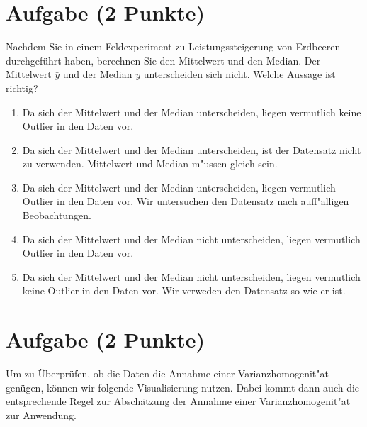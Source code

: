\documentclass[a4paper, 9pt]{scrartcl}\usepackage[]{graphicx}\usepackage[]{xcolor}
\begin{document}
\section{Aufgabe \hfill (2 Punkte)}



Nachdem Sie in einem Feldexperiment zu Leistungssteigerung von
Erdbeeren durchgef{\"u}hrt haben, berechnen Sie den Mittelwert und den
Median. Der Mittelwert $\bar{y}$ und der Median $\tilde{y}$
unterscheiden sich nicht. Welche Aussage ist richtig?




\begin{enumerate}
\item [\textbf{A} \msquare] Da sich der Mittelwert und der Median unterscheiden, liegen vermutlich keine Outlier in den Daten vor.
\item [\textbf{B} \msquare] Da sich der Mittelwert und der Median unterscheiden, ist der Datensatz nicht zu verwenden. Mittelwert und Median m{"u}ssen gleich sein.
\item [\textbf{C} \msquare] Da sich der Mittelwert und der Median unterscheiden, liegen vermutlich Outlier in den Daten vor. Wir untersuchen den Datensatz nach auff{"a}lligen Beobachtungen.
\item [\textbf{D} \msquare] Da sich der Mittelwert und der Median nicht unterscheiden, liegen vermutlich Outlier in den Daten vor.
\item [\textbf{E} \msquare] Da sich der Mittelwert und der Median nicht unterscheiden, liegen vermutlich keine Outlier in den Daten vor. Wir verweden den Datensatz so wie er ist.
\end{enumerate}

\section{Aufgabe \hfill (2 Punkte)}



Um zu {\"U}berpr{\"u}fen, ob die Daten die Annahme einer Varianzhomogenit{"a}t gen{\"u}gen, k{\"o}nnen
wir folgende Visualisierung nutzen. Dabei kommt dann auch die entsprechende
Regel zur Absch{\"a}tzung der Annahme einer Varianzhomogenit{"a}t zur Anwendung. 
\end{document}
